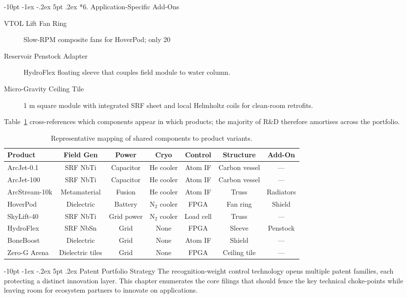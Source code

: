\documentclass[12pt,letterpaper]{book}
\makeatletter
\renewcommand\section{\@startsection {section}{1}{\z@}%
                {-10pt \@plus -1ex \@minus -.2ex}%
                {5pt \@plus.2ex}%
                {\normalfont\large\bfseries}}
\makeatother
\begin{document}
\section*{6. Application-Specific Add-Ons}
\begin{description}
 \item[VTOL Lift Fan Ring] Slow-RPM composite fans for HoverPod; only 20 %
 \item[Reservoir Penstock Adapter] HydroFlex floating sleeve that couples field module to water column.
 \item[Micro-Gravity Ceiling Tile] 1 m square module with integrated SRF sheet and local Helmholtz coils for clean-room retrofits.
\end{description}

Table~\ref{tab:component_map} cross-references which components appear in which products; the majority of R&D therefore amortises across the portfolio.

\begin{table}[h]
\centering
\begin{tabular}{@{}lcccccc@{}}
\toprule
Product & Field Gen & Power & Cryo & Control & Structure & Add-On \\ \midrule
ArcJet-0.1 & SRF NbTi & Capacitor & He cooler & Atom IF & Carbon vessel & — \\
ArcJet-100 & SRF NbTi & Capacitor & He cooler & Atom IF & Carbon vessel & — \\
ArcStream-10k & Metamaterial & Fusion & He cooler & Atom IF & Truss & Radiators \\
HoverPod & Dielectric & Battery & N$_2$ cooler & FPGA & Fan ring & Shield \\
SkyLift-40 & SRF NbTi & Grid power & N$_2$ cooler & Load cell & Truss & — \\
HydroFlex & SRF NbSn & Grid & None & FPGA & Sleeve & Penstock \\
BoneBoost & Dielectric & Grid & None & Atom IF & Shield & — \\
Zero-G Arena & Dielectric tiles & Grid & None & FPGA & Ceiling tile & — \\
\bottomrule
\end{tabular}
\caption{Representative mapping of shared components to product variants.}
\label{tab:component_map}
\end{table}

\section{Patent Portfolio Strategy}\label{chap:patents}
The recognition-weight control technology opens multiple patent families, each protecting a distinct innovation layer.  This chapter enumerates the core filings that should fence the key technical choke-points while leaving room for ecosystem partners to innovate on applications.
\end{document}

